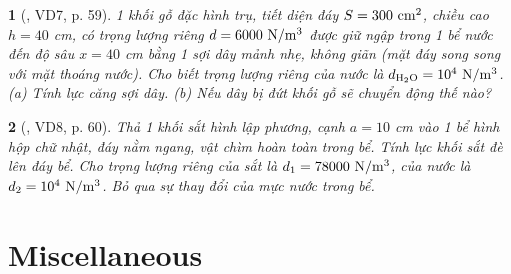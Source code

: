 \documentclass{article}
\newtheorem{baitoan}{}
\begin{document}
\begin{baitoan}[\cite{Van_Quyen_Hanh_Nhu_10_chuyen_Ly}, VD7, p. 59]
	1 khối gỗ đặc hình trụ, tiết diện đáy $S = 300\ {\rm cm^2}$, chiều cao $h = 40$ {\rm cm}, có trọng lượng riêng $d = 6000\ {\rm N{\tt/}m^3}$ được giữ ngập trong 1 bể nước đến độ sâu $x = 40$ {\rm cm} bằng 1 sợi dây mảnh nhẹ, không giãn (mặt đáy song song với mặt thoáng nước). Cho biết trọng lượng riêng của nước là $d_{\rm H_2O} = 10^4\ {\rm N{\tt/}m^3}$. (a) Tính lực căng sợi dây. (b) Nếu dây bị đứt khối gỗ sẽ chuyển động thế nào?
\end{baitoan}

\begin{baitoan}[\cite{Van_Quyen_Hanh_Nhu_10_chuyen_Ly}, VD8, p. 60]
	Thả 1 khối sắt hình lập phương, cạnh $a = 10$ {\rm cm} vào 1 bể hình hộp chữ nhật, đáy nằm ngang, vật chìm hoàn toàn trong bể. Tính lực khối sắt đè lên đáy bể. Cho trọng lượng riêng của sắt là $d_1 = 78000\ {\rm N{\tt/}m^3}$, của nước là $d_2 = 10^4\ {\rm N{\tt/}m^3}$. Bỏ qua sự thay đổi của mực nước trong bể.
\end{baitoan}


\section{Miscellaneous}


\printbibliography[heading=bibintoc]
	
\end{document}
